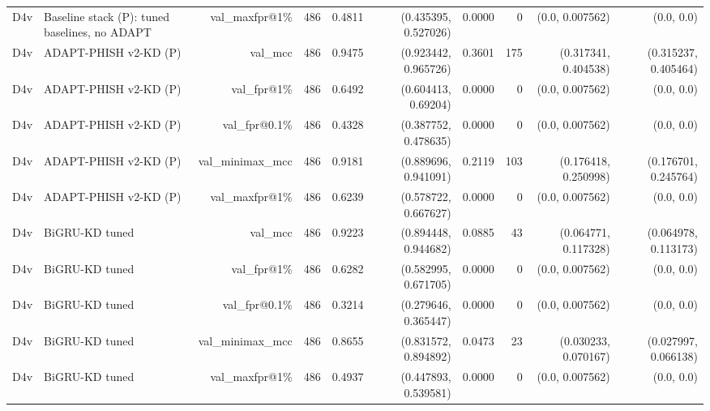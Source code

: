 \begin{table}[t]
\begin{tabular}{llrrrrrrrr}
D4v & Baseline stack (P): tuned baselines, no ADAPT & val\_maxfpr@1\% & 486 & 0.4811 & (0.435395, 0.527026) & 0.0000 & 0 & (0.0, 0.007562) & (0.0, 0.0) \\
D4v & ADAPT-PHISH v2-KD (P) & val\_mcc & 486 & 0.9475 & (0.923442, 0.965726) & 0.3601 & 175 & (0.317341, 0.404538) & (0.315237, 0.405464) \\
D4v & ADAPT-PHISH v2-KD (P) & val\_fpr@1\% & 486 & 0.6492 & (0.604413, 0.69204) & 0.0000 & 0 & (0.0, 0.007562) & (0.0, 0.0) \\
D4v & ADAPT-PHISH v2-KD (P) & val\_fpr@0.1\% & 486 & 0.4328 & (0.387752, 0.478635) & 0.0000 & 0 & (0.0, 0.007562) & (0.0, 0.0) \\
D4v & ADAPT-PHISH v2-KD (P) & val\_minimax\_mcc & 486 & 0.9181 & (0.889696, 0.941091) & 0.2119 & 103 & (0.176418, 0.250998) & (0.176701, 0.245764) \\
D4v & ADAPT-PHISH v2-KD (P) & val\_maxfpr@1\% & 486 & 0.6239 & (0.578722, 0.667627) & 0.0000 & 0 & (0.0, 0.007562) & (0.0, 0.0) \\
D4v & BiGRU-KD tuned & val\_mcc & 486 & 0.9223 & (0.894448, 0.944682) & 0.0885 & 43 & (0.064771, 0.117328) & (0.064978, 0.113173) \\
D4v & BiGRU-KD tuned & val\_fpr@1\% & 486 & 0.6282 & (0.582995, 0.671705) & 0.0000 & 0 & (0.0, 0.007562) & (0.0, 0.0) \\
D4v & BiGRU-KD tuned & val\_fpr@0.1\% & 486 & 0.3214 & (0.279646, 0.365447) & 0.0000 & 0 & (0.0, 0.007562) & (0.0, 0.0) \\
D4v & BiGRU-KD tuned & val\_minimax\_mcc & 486 & 0.8655 & (0.831572, 0.894892) & 0.0473 & 23 & (0.030233, 0.070167) & (0.027997, 0.066138) \\
D4v & BiGRU-KD tuned & val\_maxfpr@1\% & 486 & 0.4937 & (0.447893, 0.539581) & 0.0000 & 0 & (0.0, 0.007562) & (0.0, 0.0) \\
\bottomrule
\end{tabular}
\end{table}